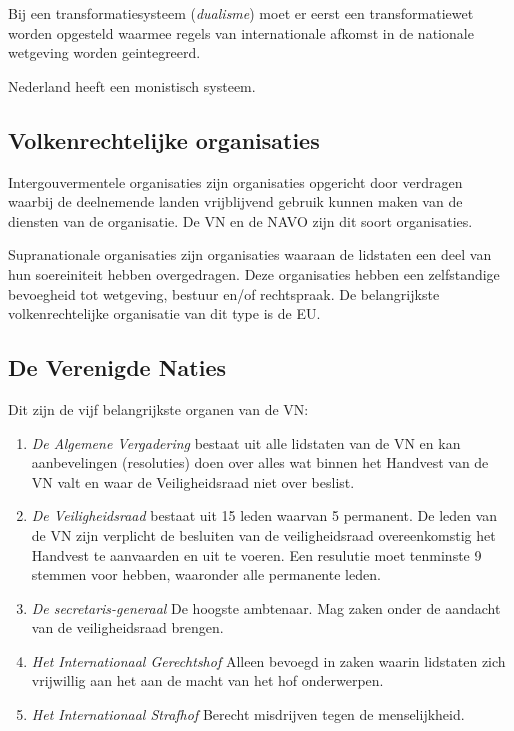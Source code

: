 \documentclass{article}
\begin{document}
Bij een transformatiesysteem (\emph{dualisme}) moet er eerst een transformatiewet
worden opgesteld waarmee regels van internationale afkomst in de nationale wetgeving
worden geintegreerd.

Nederland heeft een monistisch systeem.

\subsection{Volkenrechtelijke organisaties}

Intergouvermentele organisaties zijn organisaties opgericht door verdragen waarbij
de deelnemende landen vrijblijvend gebruik kunnen maken van de diensten van de
organisatie. De VN en de NAVO zijn dit soort organisaties.

Supranationale organisaties zijn organisaties waaraan de lidstaten een deel van
hun soereiniteit hebben overgedragen. Deze organisaties hebben een zelfstandige
bevoegheid tot wetgeving, bestuur en/of rechtspraak. De belangrijkste volkenrechtelijke
organisatie van dit type is de EU.

\subsection{De Verenigde Naties}

Dit zijn de vijf belangrijkste organen van de VN:

\begin{enumerate}

  \item \emph{De Algemene Vergadering} bestaat uit alle lidstaten van de VN en
    kan aanbevelingen (resoluties) doen over alles wat binnen het Handvest van
    de VN valt en waar de Veiligheidsraad niet over beslist.

  \item \emph{De Veiligheidsraad} bestaat uit 15 leden waarvan 5 permanent. De
    leden van de VN zijn verplicht de besluiten van de veiligheidsraad
    overeenkomstig het Handvest te aanvaarden en uit te voeren. Een resulutie
    moet tenminste 9 stemmen voor hebben, waaronder alle permanente leden.

  \item \emph{De secretaris-generaal} De hoogste ambtenaar. Mag zaken onder de
    aandacht van de veiligheidsraad brengen.

  \item \emph{Het Internationaal Gerechtshof} Alleen bevoegd in zaken waarin
    lidstaten zich vrijwillig aan het aan de macht van het hof onderwerpen.

  \item \emph{Het Internationaal Strafhof} Berecht misdrijven tegen de
    menselijkheid.
\end{enumerate}
\end{document}

